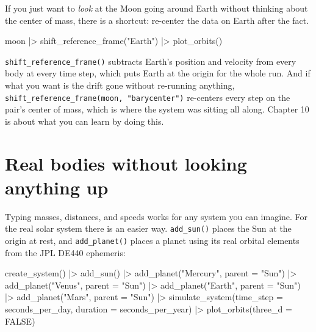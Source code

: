 \documentclass[
  10.5pt,
  letterpaper,
]{scrbook}
\newenvironment{Shaded}{\begin{snugshade}}{\end{snugshade}}
\newcommand{\AttributeTok}[1]{\textcolor[rgb]{0.00,0.00,0.00}{#1}}
\newcommand{\ConstantTok}[1]{\textcolor[rgb]{0.00,0.00,0.00}{#1}}
\newcommand{\FunctionTok}[1]{\textcolor[rgb]{0.00,0.00,0.00}{#1}}
\newcommand{\NormalTok}[1]{\textcolor[rgb]{0.00,0.00,0.00}{#1}}
\newcommand{\SpecialCharTok}[1]{\textcolor[rgb]{0.00,0.00,0.00}{#1}}
\newcommand{\StringTok}[1]{\textcolor[rgb]{0.00,0.00,0.00}{#1}}
\theoremstyle{definition}
\theoremstyle{plain}
\theoremstyle{remark}
\begin{document}
If you just want to \emph{look} at the Moon going around Earth without
thinking about the center of mass, there is a shortcut: re-center the
data on Earth after the fact.

\begin{Shaded}
\begin{Highlighting}[]
\NormalTok{moon }\SpecialCharTok{|\textgreater{}}
  \FunctionTok{shift\_reference\_frame}\NormalTok{(}\StringTok{"Earth"}\NormalTok{) }\SpecialCharTok{|\textgreater{}}
  \FunctionTok{plot\_orbits}\NormalTok{()}
\end{Highlighting}
\end{Shaded}

\texttt{shift\_reference\_frame()} subtracts Earth's position and
velocity from every body at every time step, which puts Earth at the
origin for the whole run. And if what you want is the drift gone without
re-running anything,
\texttt{shift\_reference\_frame(moon,\ "barycenter")} re-centers every
step on the pair's center of mass, which is where the system was sitting
all along. Chapter 10 is about what you can learn by doing this.

\section{Real bodies without looking anything
up}\label{real-bodies-without-looking-anything-up}

Typing masses, distances, and speeds works for any system you can
imagine. For the real solar system there is an easier way.
\texttt{add\_sun()} places the Sun at the origin at rest, and
\texttt{add\_planet()} places a planet using its real orbital elements
from the JPL DE440 ephemeris:

\begin{Shaded}
\begin{Highlighting}[]
\FunctionTok{create\_system}\NormalTok{() }\SpecialCharTok{|\textgreater{}}
  \FunctionTok{add\_sun}\NormalTok{() }\SpecialCharTok{|\textgreater{}}
  \FunctionTok{add\_planet}\NormalTok{(}\StringTok{"Mercury"}\NormalTok{, }\AttributeTok{parent =} \StringTok{"Sun"}\NormalTok{) }\SpecialCharTok{|\textgreater{}}
  \FunctionTok{add\_planet}\NormalTok{(}\StringTok{"Venus"}\NormalTok{,   }\AttributeTok{parent =} \StringTok{"Sun"}\NormalTok{) }\SpecialCharTok{|\textgreater{}}
  \FunctionTok{add\_planet}\NormalTok{(}\StringTok{"Earth"}\NormalTok{,   }\AttributeTok{parent =} \StringTok{"Sun"}\NormalTok{) }\SpecialCharTok{|\textgreater{}}
  \FunctionTok{add\_planet}\NormalTok{(}\StringTok{"Mars"}\NormalTok{,    }\AttributeTok{parent =} \StringTok{"Sun"}\NormalTok{) }\SpecialCharTok{|\textgreater{}}
  \FunctionTok{simulate\_system}\NormalTok{(}\AttributeTok{time\_step =}\NormalTok{ seconds\_per\_day, }\AttributeTok{duration =}\NormalTok{ seconds\_per\_year) }\SpecialCharTok{|\textgreater{}}
  \FunctionTok{plot\_orbits}\NormalTok{(}\AttributeTok{three\_d =} \ConstantTok{FALSE}\NormalTok{)}
\end{Highlighting}
\end{Shaded}
\end{document}
